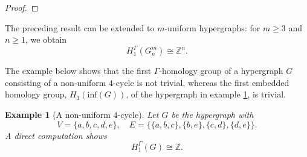 \documentclass[11pt]{amsart}
\newtheorem{ex}[subsection]{Example}
\begin{document}
\begin{proof}
           \end{proof}



%
%
%
The preceding result can be extended to $m$-uniform hypergraphs: for $m\ge3$ and $n\ge1$, we obtain
\[
H_1^\Gamma(G_n^m)\cong\mathbb{Z}^n.
\]

The example below shows that the first $\Gamma$-homology group of a hypergraph $G$ consisting of a non-uniform $4$-cycle is not trivial, whereas the first embedded homology group, $H_1(\text{inf}(G))$, of the hypergraph in example \ref{general 3-cycle}, is trivial. 

\begin{ex}[A non-uniform $4$-cycle]\label{general 3-cycle}
Let $G$ be the hypergraph with
\[
V=\{a,b,c,d,e\}, \quad E=\{\{a,b,c\},\{b,e\},\{c,d\},\{d,e\}\}.
\]
A direct computation shows
\[
H_1^\Gamma(G)\cong \mathbb{Z}.
\]
\end{ex}
\end{document}
